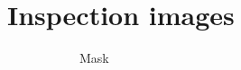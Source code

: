 \section{Inspection images}\label{ap:inspec_img}
 \begin{figure}[!t]	
     \centering
     \begin{subfigure}[t]{0.24\linewidth}
     	\centering
  	\caption{Mask}
  	\label{fig:TS_05_20_13_50_44}
  \end{subfigure}
     \hfill
     \begin{subfigure}[t]{0.24\linewidth}
  	\centering

\end{subfigure}
\end{figure}
